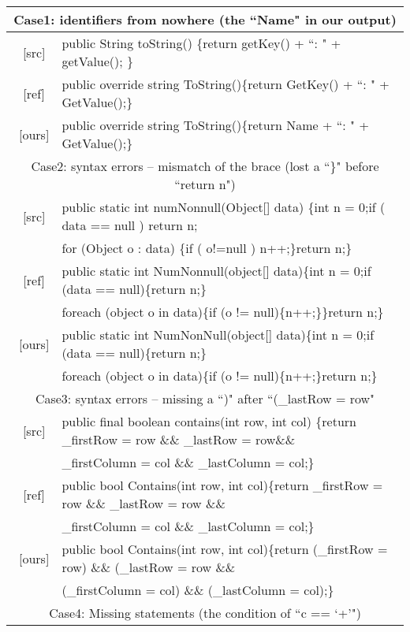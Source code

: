 \documentclass{article} \usepackage{iclr2021_conference,times}
\begin{document}
\iffalse 
\begin{table*}[h!]
\small
\begin{center}
\begin{tabular}{c|l}
\toprule 
\multicolumn{2}{c}{Case1: identifiers from nowhere (the ``Name" in our output)} \\
\midrule
\ [src] & public String toString() \{return getKey() + ``: " + getValue(); \} \\
\hline
\ [ref] & public override string ToString()\{return GetKey() + ``: " + GetValue();\} \\
\hline
\ [ours] & public override string ToString()\{return Name + ``: " + GetValue();\}\\
\midrule
\multicolumn{2}{c}{Case2: syntax errors -- mismatch of the brace (lost a ``\}" before ``return n")} \\
\midrule
\ [src] & public static int numNonnull(Object[] data) \{int n = 0;if ( data == null ) return n;\\
& for (Object o : data) \{if ( o!=null ) n++;\}return n;\} \\
\hline
\ [ref] & public static int NumNonnull(object[] data)\{int n = 0;if (data == null)\{return n;\}\\
& foreach (object o in data)\{if (o != null)\{n++;\}\}return n;\} \\
\hline
\ [ours] & public static int NumNonNull(object[] data)\{int n = 0;if (data == null)\{return n;\}\\
&foreach (object o in data)\{if (o != null)\{n++;\}return n;\}\\
\midrule
\multicolumn{2}{c}{Case3: syntax errors -- missing a ``)" after ``(\_lastRow = row"} \\
\midrule
\ [src] & public final boolean contains(int row, int col) \{return \_firstRow = row \&\& \_lastRow = row\&\& \\
& \_firstColumn = col \&\& \_lastColumn = col;\} \\
\hline
\ [ref] & public bool Contains(int row, int col)\{return \_firstRow = row \&\& \_lastRow = row \&\& \\
& \_firstColumn = col \&\& \_lastColumn = col;\} \\
\hline
\ [ours] & public bool Contains(int row, int col)\{return (\_firstRow = row) \&\& (\_lastRow = row \&\& \\
& (\_firstColumn = col) \&\& (\_lastColumn = col);\} \\
\midrule
\multicolumn{2}{c}{Case4: Missing statements (the condition of ``c == `+'")} \\

\end{tabular}
\end{center}
\end{table*}
\end{document}
